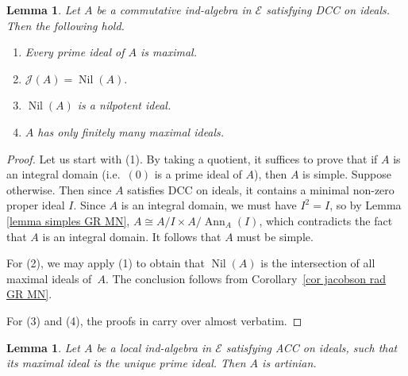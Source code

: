\documentclass[11pt]{amsart}
\def\JJ{\mathcal{J}}
\def\Es{\mathscr{E}}
\newtheorem{lemma}[thm]{Lemma}
\theoremstyle{definition}
\theoremstyle{remark}
\numberwithin{equation}{section}
\begin{document}
\begin{lemma}\label{lemma DCC}
    Let $A$ be a commutative ind-algebra in $\Es$ satisfying DCC on ideals. Then the following hold.
    \begin{enumerate}
        \item Every prime ideal of $A$ is maximal.
        \item $\JJ(A)=\operatorname{Nil}(A).$ 
        \item $\operatorname{Nil}(A)$ is a nilpotent ideal.
        \item $A$ has only finitely many maximal ideals.
    \end{enumerate}
\end{lemma}

\begin{proof}
    Let us start with (1).  By taking a quotient, it suffices to prove that if $A$ is an integral domain (i.e.~$(0)$ is a prime ideal of $A$), then $A$ is simple.  Suppose otherwise.  Then since $A$ satisfies DCC on ideals, it contains a minimal non-zero proper ideal $I$.  Since $A$ is an integral domain, we must have $I^2=I$, so by Lemma \ref{lemma simples GR MN}, $A\cong A/I\times A/\operatorname{Ann}_A(I)$, which contradicts the fact that $A$ is an integral domain.  It follows that $A$ must be simple.

    For (2), we may apply (1) to obtain that $\operatorname{Nil}(A)$ is the intersection of all maximal ideals of~$A$.  The conclusion follows from Corollary~\ref{cor jacobson rad GR MN}.

    For (3) and (4), the proofs in \cite[Prop.~8.3 and Prop.~8.4]{AM} carry over almost verbatim.
\end{proof}

\begin{lemma}\label{lemma local artin alg}
    Let $A$ be a local ind-algebra in $\Es$ satisfying ACC on ideals, such that its maximal ideal is the unique prime ideal.  Then $A$ is artinian.
\end{lemma}
\end{document}
